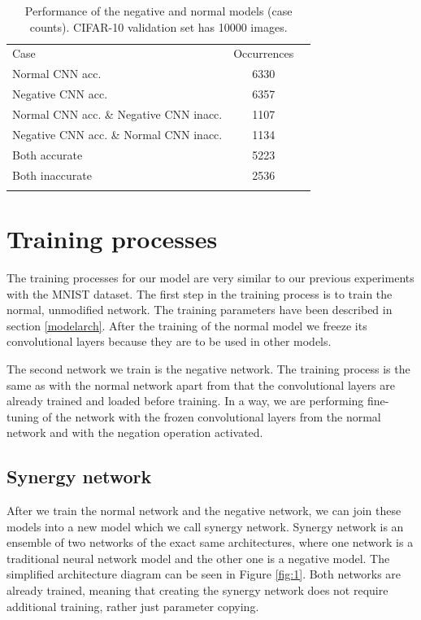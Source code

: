 \documentclass[b5paper]{book}
\let\cite\parencite
\begin{document}
\begin{table}
\centering
\caption{Performance of the negative and normal models (case counts). CIFAR-10 validation set has 10000 images.}
\label{tab:2}
\begin{tabular}{lcc}
\hline\noalign{\smallskip}
Case & Occurrences \\
\noalign{\smallskip}\hline\noalign{\smallskip}
Normal CNN acc. & 6330 \\
Negative CNN acc. & 6357 \\
Normal CNN acc. \& Negative CNN inacc. & 1107 \\
Negative CNN acc. \& Normal CNN inacc. & 1134 \\
Both accurate & 5223 \\
Both inaccurate & 2536 \\
\noalign{\smallskip}\hline
\end{tabular}
\end{table}

\section{Training processes}
\label{datasettraining}

The training processes for our model are very similar to our previous experiments with the MNIST dataset. \cite{milovsevic2019classification} The first step in the training process is to train the normal, unmodified network. The training parameters have been described in section \ref{modelarch}. After the training of the normal model we freeze its convolutional layers because they are to be used in other models.

The second network we train is the negative network. The training process is the same as with the normal network apart from that the convolutional layers are already trained and loaded before training. In a way, we are performing fine-tuning of the network with the frozen convolutional layers from the normal network and with the negation operation activated. 
\subsection{Synergy network}
\label{synergy}

After we train the normal network and the negative network, we can join these models into a new model which we call synergy network. Synergy network is an ensemble of two networks of the exact same architectures, where one network is a traditional neural network model and the other one is a negative model. The simplified architecture diagram can be seen in Figure \ref{fig:1}. Both networks are already trained, meaning that creating the synergy network does not require additional training, rather just parameter copying. 
\end{document}
